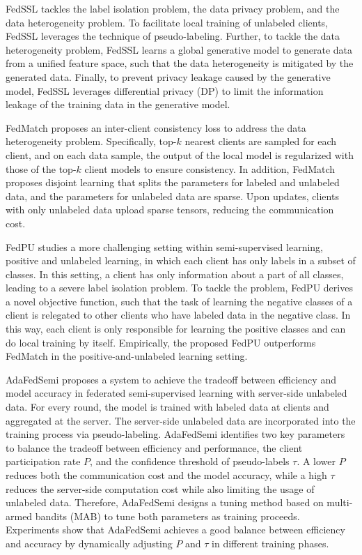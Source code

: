 \documentclass[11pt]{article}
\begin{document}
FedSSL \cite{fan2022private} tackles the label isolation problem, the data privacy problem, and the data heterogeneity problem. To facilitate local training of unlabeled clients, FedSSL leverages the technique of pseudo-labeling. Further, to tackle the data heterogeneity problem, FedSSL learns a global generative model to generate data from a unified feature space, such that the data heterogeneity is mitigated by the generated data. Finally, to prevent privacy leakage caused by the generative model, FedSSL leverages differential privacy (DP) to limit the information leakage of the training data in the generative model.  

FedMatch \cite{jeong2021federated} proposes an inter-client consistency loss to address the data heterogeneity problem. Specifically, top-$k$ nearest clients are sampled for each client, and on each data sample, the output of the local model is regularized with those of the top-$k$ client models to ensure consistency. In addition, FedMatch proposes disjoint learning that splits the parameters for labeled and unlabeled data, and the parameters for unlabeled data are sparse. Upon updates, clients with only unlabeled data upload sparse tensors, reducing the communication cost. 

FedPU \cite{lin2022federated} studies a more challenging setting within semi-supervised learning, positive and unlabeled learning, in which each client has only labels in a subset of classes. In this setting, a client has only information about a part of all classes, leading to a severe label isolation problem. To tackle the problem, FedPU derives a novel objective function, such that the task of learning the negative classes of a client is relegated to other clients who have labeled data in the negative class. In this way, each client is only responsible for learning the positive classes and can do local training by itself. Empirically, the proposed FedPU outperforms FedMatch \cite{jeong2021federated} in the positive-and-unlabeled learning setting. 

AdaFedSemi \cite{wang2022enhancing} proposes a system to achieve the tradeoff between efficiency and model accuracy in federated semi-supervised learning with server-side unlabeled data. For every round, the model is trained with labeled data at clients and aggregated at the server. The server-side unlabeled data are incorporated into the training process via pseudo-labeling. AdaFedSemi \cite{wang2022enhancing} identifies two key parameters to balance the tradeoff between efficiency and performance, the client participation rate $P$, and the confidence threshold of pseudo-labels $\tau$. A lower $P$ reduces both the communication cost and the model accuracy, while a high $\tau$ reduces the server-side computation cost while also limiting the usage of unlabeled data. Therefore, AdaFedSemi designs a tuning method based on multi-armed bandits (MAB) to tune both parameters as training proceeds. Experiments show that AdaFedSemi achieves a good balance between efficiency and accuracy by dynamically adjusting $P$ and $\tau$ in different training phases. 
\end{document}
